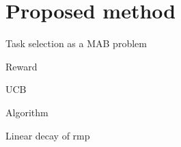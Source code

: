 \section{Proposed method}

\begin{frame}{Task selection as a MAB problem}
    \begin{block}{Reward}
    \end{block}
    \begin{block}{UCB}
    \end{block}
\end{frame}

\begin{frame}{Algorithm}
\end{frame}

\begin{frame}{Linear decay of rmp}
\end{frame}